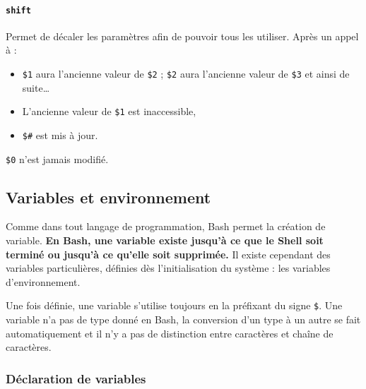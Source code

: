\paragraph{\texttt{shift}} 
Permet de décaler les paramètres afin de pouvoir tous les utiliser. Après un appel à  : 
\begin{itemize}
    \item \texttt{\$1} aura l'ancienne valeur de \texttt{\$2} ; \texttt{\$2} aura l'ancienne valeur de \texttt{\$3} et ainsi de suite\dots
    \item L'ancienne valeur de \texttt{\$1} est inaccessible,
    \item \texttt{\$\#} est mis à jour.
\end{itemize}

 \texttt{\$0} n'est jamais modifié.

\newpage


\subsection{Variables et environnement}

Comme dans tout langage de programmation, Bash permet la création de variable. \textbf{En Bash, une variable existe jusqu'à ce que le Shell soit terminé ou jusqu'à ce qu'elle soit supprimée.} Il existe cependant des variables particulières, définies dès l'initialisation du système : les variables d'environnement.

Une fois définie, une variable s'utilise toujours en la préfixant du signe \texttt{\$}. Une variable n'a pas de type donné en Bash, la conversion d'un type à un autre se fait automatiquement et il n'y a pas de distinction entre caractères et chaîne de caractères.

\subsubsection{Déclaration de variables} 

